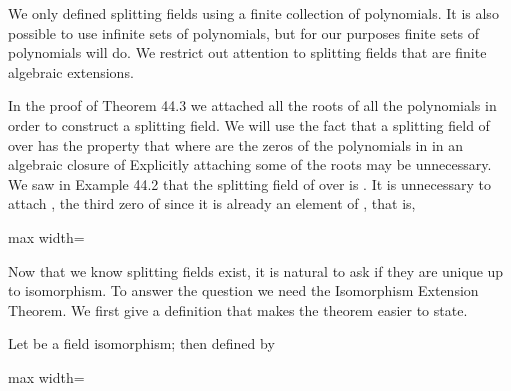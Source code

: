 \documentclass[11pt,oneside]{article}
\begin{document}
\begin{BookBody}
We only defined splitting fields using a finite collection of polynomials. It is also possible to use infinite sets of polynomials, but for our purposes finite sets of polynomials will do. We restrict out attention to splitting fields that are finite algebraic extensions.

In the proof of Theorem 44.3 we attached all the roots of all the polynomials in order to construct a splitting field. We will use the fact that a splitting field  of  over  has the property that  where  are the zeros of the polynomials in  in an algebraic closure of  Explicitly attaching some of the roots may be unnecessary. We saw in Example 44.2 that the splitting field of  over  is . It is unnecessary to attach , the third zero of  since it is already an element of , that is,

\begin{center}\begin{adjustbox}{max width=\linewidth}\end{adjustbox}\end{center}


\noindent Now that we know splitting fields exist, it is natural to ask if they are unique up to isomorphism. To answer the question we need the Isomorphism Extension Theorem. We first give a definition that makes the theorem easier to state.

 Let  be a field isomorphism; then  defined by

\begin{center}\begin{adjustbox}{max width=\linewidth}\end{adjustbox}\end{center}


\end{BookBody}
\end{document}
